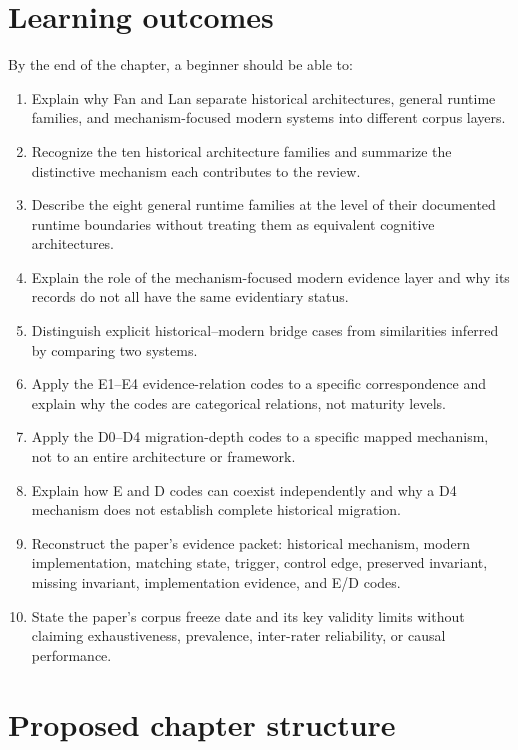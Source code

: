 \section{Learning outcomes}
By the end of the chapter, a beginner should be able to:
\begin{enumerate}
  \item Explain why Fan and Lan separate historical architectures, general runtime families, and mechanism-focused modern systems into different corpus layers.
  \item Recognize the ten historical architecture families and summarize the distinctive mechanism each contributes to the review.
  \item Describe the eight general runtime families at the level of their documented runtime boundaries without treating them as equivalent cognitive architectures.
  \item Explain the role of the mechanism-focused modern evidence layer and why its records do not all have the same evidentiary status.
  \item Distinguish explicit historical--modern bridge cases from similarities inferred by comparing two systems.
  \item Apply the E1--E4 evidence-relation codes to a specific correspondence and explain why the codes are categorical relations, not maturity levels.
  \item Apply the D0--D4 migration-depth codes to a specific mapped mechanism, not to an entire architecture or framework.
  \item Explain how E and D codes can coexist independently and why a D4 mechanism does not establish complete historical migration.
  \item Reconstruct the paper's evidence packet: historical mechanism, modern implementation, matching state, trigger, control edge, preserved invariant, missing invariant, implementation evidence, and E/D codes.
  \item State the paper's corpus freeze date and its key validity limits without claiming exhaustiveness, prevalence, inter-rater reliability, or causal performance.
\end{enumerate}

\section*{Proposed chapter structure}

